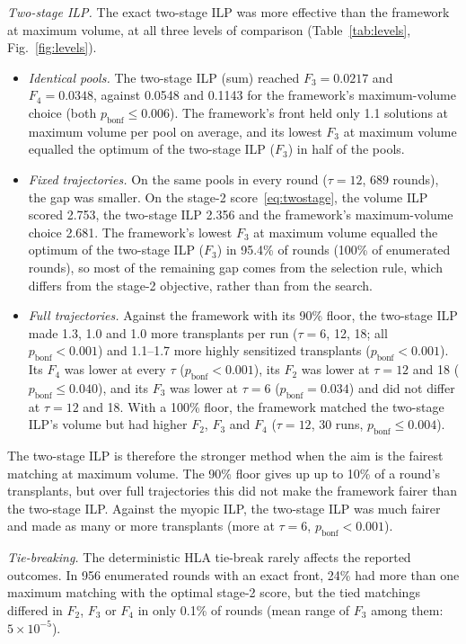\documentclass[journal]{IEEEtran}
\begin{document}
\emph{Two-stage ILP.} The exact two-stage ILP was more effective than
the framework at maximum volume, at all three levels of comparison
(Table~\ref{tab:levels}, Fig.~\ref{fig:levels}).
\begin{itemize}
  \item \emph{Identical pools.} The two-stage ILP (sum) reached
    $F_3 = 0.0217$ and $F_4 = 0.0348$, against 0.0548 and 0.1143 for
    the framework's maximum-volume choice (both
    $p_{\mathrm{bonf}} \leq 0.006$). The framework's front held only
    1.1 solutions at maximum volume per pool on average, and its
    lowest $F_3$ at maximum volume equalled the optimum of the
    two-stage ILP ($F_3$) in half of the pools.
  \item \emph{Fixed trajectories.} On the same pools in every round
    ($\tau = 12$, 689 rounds), the gap was smaller. On the stage-2
    score~\eqref{eq:twostage}, the volume ILP scored 2.753, the
    two-stage ILP 2.356 and the framework's maximum-volume choice
    2.681. The framework's lowest $F_3$ at maximum volume equalled the
    optimum of the two-stage ILP ($F_3$) in 95.4\% of rounds (100\% of
    enumerated rounds), so
    most of the remaining gap comes from the selection rule, which
    differs from the stage-2 objective, rather than from the search.
  \item \emph{Full trajectories.} Against the framework with its 90\%
    floor, the two-stage ILP made 1.3, 1.0 and 1.0 more transplants
    per run ($\tau = 6$, 12, 18; all $p_{\mathrm{bonf}} < 0.001$) and
    1.1--1.7 more highly sensitized transplants
    ($p_{\mathrm{bonf}} < 0.001$). Its $F_4$ was lower at every $\tau$
    ($p_{\mathrm{bonf}} < 0.001$), its $F_2$ was lower at $\tau = 12$
    and 18 ($p_{\mathrm{bonf}} \leq 0.040$), and its $F_3$ was lower at
    $\tau = 6$ ($p_{\mathrm{bonf}} = 0.034$) and did not differ at
    $\tau = 12$ and 18. With a 100\% floor, the framework matched the
    two-stage ILP's volume but had higher $F_2$, $F_3$ and $F_4$
    ($\tau = 12$, 30 runs, $p_{\mathrm{bonf}} \leq 0.004$).
\end{itemize}
The two-stage ILP is therefore the stronger method when the aim is
the fairest matching at maximum volume. The 90\% floor gives up up to
10\% of a round's transplants, but over full trajectories this did not
make the framework fairer than the two-stage ILP. Against the myopic
ILP, the two-stage ILP was much fairer and made as many or more
transplants (more at $\tau = 6$, $p_{\mathrm{bonf}} < 0.001$).

\emph{Tie-breaking.} The deterministic HLA tie-break rarely affects the
reported outcomes. In 956 enumerated rounds with an exact front,
24\% had more than one maximum matching with the optimal stage-2
score, but the tied matchings differed in $F_2$, $F_3$ or $F_4$ in only
0.1\% of rounds (mean range of $F_3$ among them: $5 \times 10^{-5}$).
\end{document}
